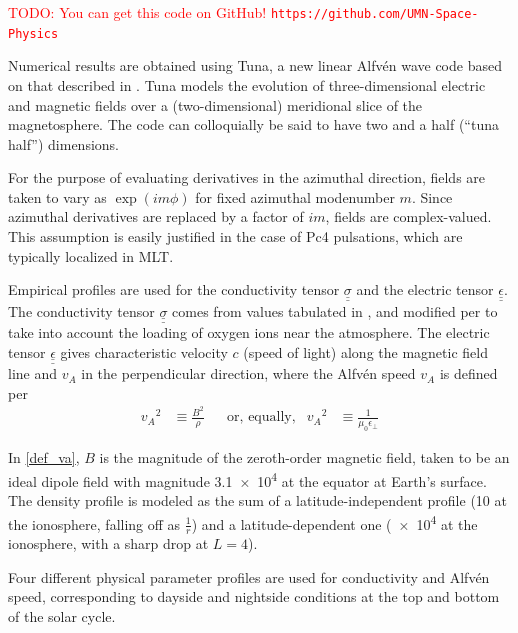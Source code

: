 \documentclass{article}
\newcommand{\todo}[1]{ \textcolor{red}{TODO: #1} }
\newcommand{\Alfven}{Alfv\'en\xspace}
\newcommand{\tensor}[1]{\ensuremath{\underline{\underline{#1}}}}
\newcommand{\lr}[1]{ \left( #1 \right) }
\renewcommand{\arg}[1]{\!\lr{#1}}
\newcommand{\azm}{\ensuremath{m}\xspace}
\newcommand{\va}{\ensuremath{v_A}\xspace}
\newcommand{\ep}{\ensuremath{\epsilon_\bot}\xspace}
\newcommand{\mz}{\ensuremath{\mu_0}\xspace}
\begin{document}
\todo{You can get this code on GitHub! \texttt{https://github.com/UMN-Space-Physics} }

Numerical results are obtained using Tuna, a new linear \Alfven wave code based on that described in \cite{lysak_2013}. Tuna models the evolution of three-dimensional electric and magnetic fields over a (two-dimensional) meridional slice of the magnetosphere. The code can colloquially be said to have two and a half (``tuna half'') dimensions.

For the purpose of evaluating derivatives in the azimuthal direction, fields are taken to vary as $\exp \arg{i \azm \phi}$ for fixed azimuthal modenumber \azm. Since azimuthal derivatives are replaced by a factor of $i \azm$, fields are complex-valued. This assumption is easily justified in the case of Pc4 pulsations, which are typically localized in MLT\cite{anderson_1990,dai_2015,engebretson_1992,liu_2009}.


Empirical profiles are used for the conductivity tensor $\tensor{\sigma}$ and the electric tensor $\tensor{\epsilon}$. The conductivity tensor $\tensor{\sigma}$ comes from values tabulated in \cite{kelley_1989}, and modified per \cite{lysak_2013} to take into account the loading of oxygen ions near the atmosphere. The electric tensor $\tensor{\epsilon}$ gives characteristic velocity $c$ (speed of light) along the magnetic field line and $\va$ in the perpendicular direction, where the \Alfven speed $\va$ is defined per
\begin{align}
    \label{def_va}
    \va^2 &\equiv \frac{B^2}{\rho} &
    & \text{or, equally,} &
    \va^2 &\equiv \frac{1}{\mz\ep}
\end{align}

In \cref{def_va}, $B$ is the magnitude of the zeroth-order magnetic field, taken to be an ideal dipole field with magnitude \SI{3.1e4}{\nT} at the equator at Earth's surface. The density profile is modeled as the sum of a latitude-independent profile (\SI{10}{\percc} at the ionosphere, falling off as $\frac{1}{r}$) and a latitude-dependent one (\SI{e4}{\percc} at the ionosphere, with a sharp drop at $L = 4$).

Four different physical parameter profiles are used for conductivity and \Alfven speed, corresponding to dayside and nightside conditions at the top and bottom of the solar cycle.
\end{document}

